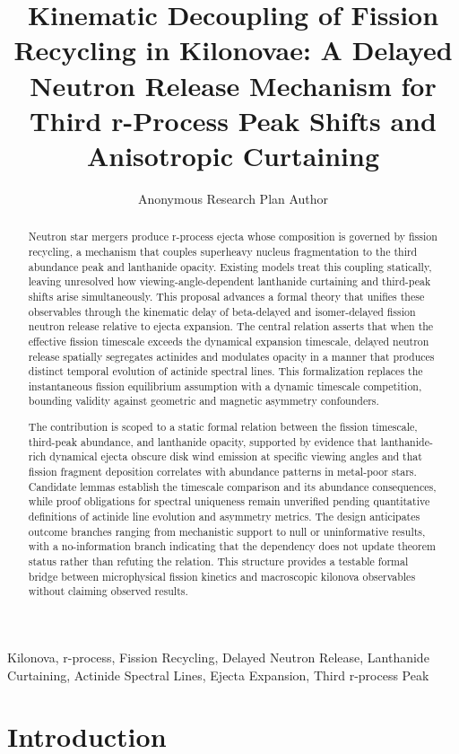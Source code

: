 \documentclass[conference]{IEEEtran}
\begin{document}
\title{Kinematic Decoupling of Fission Recycling in Kilonovae: A Delayed Neutron Release Mechanism for Third r-Process Peak Shifts and Anisotropic Curtaining}\author{Anonymous Research Plan Author}\maketitle

\begin{abstract}
Neutron star mergers produce r-process ejecta whose composition is governed by fission recycling, a mechanism that couples superheavy nucleus fragmentation to the third abundance peak and lanthanide opacity. Existing models treat this coupling statically, leaving unresolved how viewing-angle-dependent lanthanide curtaining and third-peak shifts arise simultaneously. This proposal advances a formal theory that unifies these observables through the kinematic delay of beta-delayed and isomer-delayed fission neutron release relative to ejecta expansion. The central relation asserts that when the effective fission timescale exceeds the dynamical expansion timescale, delayed neutron release spatially segregates actinides and modulates opacity in a manner that produces distinct temporal evolution of actinide spectral lines. This formalization replaces the instantaneous fission equilibrium assumption with a dynamic timescale competition, bounding validity against geometric and magnetic asymmetry confounders.

The contribution is scoped to a static formal relation between the fission timescale, third-peak abundance, and lanthanide opacity, supported by evidence that lanthanide-rich dynamical ejecta obscure disk wind emission at specific viewing angles and that fission fragment deposition correlates with abundance patterns in metal-poor stars. Candidate lemmas establish the timescale comparison and its abundance consequences, while proof obligations for spectral uniqueness remain unverified pending quantitative definitions of actinide line evolution and asymmetry metrics. The design anticipates outcome branches ranging from mechanistic support to null or uninformative results, with a no-information branch indicating that the dependency does not update theorem status rather than refuting the relation. This structure provides a testable formal bridge between microphysical fission kinetics and macroscopic kilonova observables without claiming observed results.
\end{abstract}
\begin{IEEEkeywords}
Kilonova, r-process, Fission Recycling, Delayed Neutron Release, Lanthanide Curtaining, Actinide Spectral Lines, Ejecta Expansion, Third r-process Peak
\end{IEEEkeywords}\section{Introduction}
\end{document}
